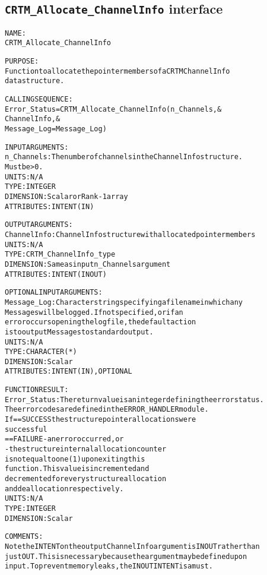 \subsection{\texttt{CRTM\_Allocate\_ChannelInfo} interface}
  \label{sec:CRTM_Allocate_ChannelInfo_interface}
  \begin{alltt}
 
  NAME:
        CRTM_Allocate_ChannelInfo
  
  PURPOSE:
        Function to allocate the pointer members of a CRTM ChannelInfo
        data structure.
 
  CALLING SEQUENCE:
        Error_Status = CRTM_Allocate_ChannelInfo( n_Channels             , &
                                                  ChannelInfo            , &
                                                  Message_Log=Message_Log  )
 
  INPUT ARGUMENTS:
        n_Channels:   The number of channels in the ChannelInfo structure.
                      Must be > 0.
                      UNITS:      N/A
                      TYPE:       INTEGER
                      DIMENSION:  Scalar or Rank-1 array
                      ATTRIBUTES: INTENT(IN)
 
  OUTPUT ARGUMENTS:
        ChannelInfo:  ChannelInfo structure with allocated pointer members
                      UNITS:      N/A
                      TYPE:       CRTM_ChannelInfo_type
                      DIMENSION:  Same as input n_Channels argument
                      ATTRIBUTES: INTENT(IN OUT)
 
  OPTIONAL INPUT ARGUMENTS:
        Message_Log:  Character string specifying a filename in which any
                      Messages will be logged. If not specified, or if an
                      error occurs opening the log file, the default action
                      is to output Messages to standard output.
                      UNITS:      N/A
                      TYPE:       CHARACTER(*)
                      DIMENSION:  Scalar
                      ATTRIBUTES: INTENT(IN), OPTIONAL
 
  FUNCTION RESULT:
        Error_Status: The return value is an integer defining the error status.
                      The error codes are defined in the ERROR_HANDLER module.
                      If == SUCCESS the structure pointer allocations were
                                    successful
                         == FAILURE - an error occurred, or
                                    - the structure internal allocation counter
                                      is not equal to one (1) upon exiting this
                                      function. This value is incremented and
                                      decremented for every structure allocation
                                      and deallocation respectively.
                      UNITS:      N/A
                      TYPE:       INTEGER
                      DIMENSION:  Scalar
 
  COMMENTS:
        Note the INTENT on the output ChannelInfo argument is IN OUT rather than
        just OUT. This is necessary because the argument may be defined upon
        input. To prevent memory leaks, the IN OUT INTENT is a must.
 
  \end{alltt}
